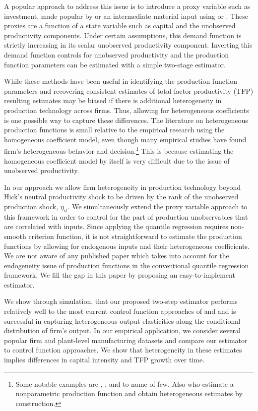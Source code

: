 \documentclass[11pt]{article}
\begin{document}
A popular approach to address this issue is to introduce a proxy variable such as investment, made popular by \cite{Olley1996} or an intermediate material input using \cite{Levinsohn2003} or \cite{Ackerberg2015}. These proxies are a function of a state variable such as capital and the unobserved productivity components. Under certain assumptions, this demand function is strictly increasing in its scalar unobserved productivity component. Inverting this demand function controls for unobserved productivity and the production function parameters can be estimated with a simple two-stage estimator.

While these methods have been useful in identifying the production function parameters and recovering consistent estimates of total factor productivity (TFP) resulting estimates may be biased if there is additional heterogeneity in production technology across firms. Thus, allowing for heterogeneous coefficients is one possible way to capture these differences. The literature on heterogeneous production functions is small relative to the empirical research using the homogeneous coefficient model, even though many empirical studies have found firm's heterogeneous behavior and decision.\footnote{Some notable examples are \cite*{Kasahara2015}, \cite*{balat}, \cite*{Li2017} and \cite*{mert} to name of few. Also \cite{Gandhi2020} who estimate a nonparametric production function and obtain heterogeneous estimates by construction.} This is because estimating the homogeneous coefficient model by itself is very difficult due to the issue of unobserved productivity. 

In our approach we allow firm heterogeneity in production technology beyond Hick's neutral productivity shock to be driven by the rank of the unobserved production shock, $\eta_{it}$.  We simultaneously extend the proxy variable approach to this framework in order to control for the part of production unobservables that are correlated with inputs. Since applying the quantile regression requires non-smooth criterion function, it is not straightforward to estimate the production functions by allowing for endogenous inputs and their heterogeneous coefficients. We are not aware of any published paper which takes into account for the endogeneity issue of production functions in the conventional quantile regression framework. We fill the gap in this paper by proposing an easy-to-implement estimator.

We show through simulation, that our proposed two-step estimator performs relatively well to the most current control function approaches of \cite{Levinsohn2003} and \cite{Ackerberg2015} and is successful in capturing heterogeneous output elasticities along the conditional distribution of firm's output. In our empirical application, we consider several popular firm and plant-level manufacturing datasets and compare our estimator to control function approaches. We show that heterogeneity in these estimates implies differences in capital intensity and TFP growth over time. 
\end{document}
